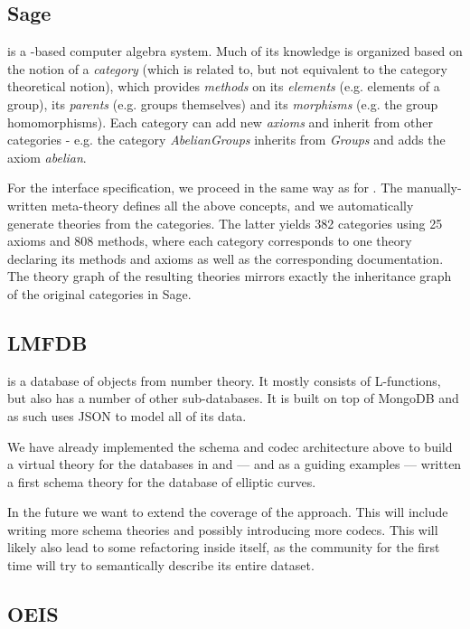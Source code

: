 \subsection{Sage}\label{sec:sage}
\SageMath \cite{sagemath} is a \python-based computer algebra system. Much of its knowledge is organized based on the notion of a \emph{category} (which is related to, but not equivalent to the category theoretical notion),
which provides \emph{methods} on its \emph{elements} (e.g. elements of a group), its \emph{parents} (e.g. groups themselves) and its \emph{morphisms}
(e.g. the group homomorphisms). Each category can add new \emph{axioms} and inherit from other categories - e.g. the category \emph{AbelianGroups} inherits from \emph{Groups} and adds the axiom \emph{abelian}.

For the interface specification, we proceed in the same way as for \GAP.
The manually-written meta-theory defines all the above concepts, and we automatically generate theories from the \SageMath categories.
The latter yields 382 categories using 25 axioms and 808 methods, where each category corresponds to one \MMT theory declaring its methods and axioms as well as the corresponding documentation.
The theory graph of the resulting theories mirrors exactly the inheritance graph of the original categories in Sage.

\subsection{LMFDB}\label{sec:lmfdb}

\LMFDB \cite{lmfdb} is a database of objects from number theory. It mostly consists of
L-functions, but also has a number of other sub-databases. It is built on top of MongoDB
and as such uses JSON to model all of its data.

We have already implemented the schema and codec architecture above to build a virtual
theory for the databases in \LMFDB and --- and as a guiding examples --- written a first schema theory for the database of elliptic curves.

In the future we want to extend the coverage of the approach. This will
include writing more schema theories and possibly introducing more codecs. This will
likely also lead to some refactoring inside \LMFDB itself, as the community for the first
time will try to semantically describe its entire dataset.

\subsection{OEIS}

